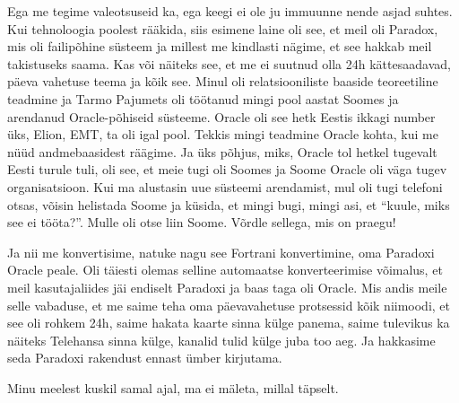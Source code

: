 
Ega me tegime valeotsuseid ka, ega keegi ei ole ju immuunne nende asjad suhtes. 
Kui tehnoloogia poolest rääkida, siis  esimene laine oli see, et meil oli 
Paradox, mis oli failipõhine süsteem ja millest me kindlasti 
nägime, et see hakkab meil takistuseks saama. Kas või näiteks see, et me ei 
suutnud olla 24h kättesaadavad, päeva vahetuse teema ja kõik see. Minul oli relatsiooniliste baaside  teoreetiline 
teadmine ja Tarmo Pajumets oli töötanud mingi pool 
aastat Soomes ja arendanud Oracle-põhiseid süsteeme. Oracle oli 
see hetk  Eestis ikkagi number üks, Elion, EMT, ta oli igal pool. Tekkis mingi 
teadmine Oracle kohta, kui me nüüd andmebaasidest räägime. Ja üks põhjus, miks, 
Oracle tol hetkel tugevalt Eesti turule tuli,  oli see, et meie tugi oli Soomes 
ja Soome Oracle oli väga tugev organisatsioon. Kui ma alustasin uue süsteemi 
arendamist,  mul oli tugi telefoni otsas, võisin helistada Soome ja küsida, et 
mingi bugi, mingi asi, et \enquote{kuule, miks see ei tööta?}. Mulle oli otse 
liin Soome. Võrdle sellega, mis on praegu!

Ja nii me konvertisime,  natuke nagu see Fortrani konvertimine, oma Paradoxi 
Oracle peale.  Oli täiesti olemas selline automaatse konverteerimise võimalus, 
et meil kasutajaliides jäi endiselt Paradoxi ja baas taga oli Oracle. Mis andis 
meile selle vabaduse, et me saime teha oma päevavahetuse protsessid kõik 
niimoodi, et see oli rohkem 24h, saime hakata kaarte sinna külge panema, saime  
tulevikus ka näiteks Telehansa sinna külge, kanalid tulid 
külge juba too aeg. Ja hakkasime seda Paradoxi rakendust ennast ümber 
kirjutama. 


Minu meelest kuskil samal ajal, ma ei mäleta, millal täpselt.


